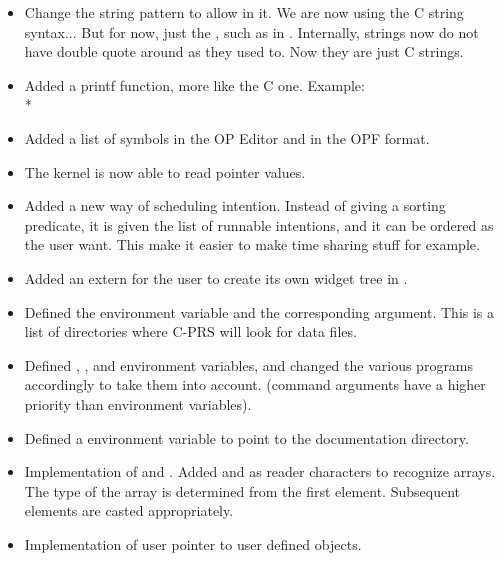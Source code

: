 \begin{itemize}

\item Change the string pattern to allow  in it. We are now using the C
string syntax... But for now, just the , such as in . Internally, strings now do not have double quote around as they
used to. Now they are just C strings.

\item Added a printf function, more like the C one. Example:\\*

\item Added a list of symbols in the OP Editor and in the OPF format.

\item The kernel is now able to read pointer values.

\item Added a new way of scheduling intention. Instead of giving a
sorting predicate, it is given the list of runnable intentions, and it can be
ordered as the user want. This make it easier to make time sharing stuff for
example.

\item Added an extern  for the user
to create its own widget tree in \XPK{}.

\item Defined the  environment variable and the
corresponding  argument. This is a list of directories where C-PRS
will look for data files.

\item Defined , ,
 and  environment variables, and
changed the various programs accordingly to take them into account. (command
arguments have a higher priority than environment variables).

\item Defined a  environment variable to point to the
documentation directory.

\item  Implementation of  and . Added \samp{[} and \samp{]}
as reader characters to recognize arrays. The type of the array is determined
from the first element.  Subsequent elements are casted appropriately.

\item  Implementation of  user pointer to user defined objects.

\end{itemize}

